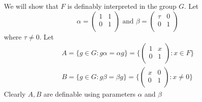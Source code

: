 \documentclass[11pt]{article}
\begin{document}
We will show that \(F\) is definably interpreted in the group \(G\). Let
\begin{equation*}
 \alpha=\begin{pmatrix}
        1&1\\
        0&1\\
        \end{pmatrix}\text{ and }
\beta=\begin{pmatrix}
\tau&0\\
0&1\\
      \end{pmatrix}
\end{equation*}
where \(\tau\neq 0\). Let
\begin{gather*}
A=\{g\in G:g\alpha=\alpha g\}=\{\begin{pmatrix}
1&x\\
0&1\\
                                \end{pmatrix}:x\in F\}\\
B=\{g\in G:g\beta=\beta g\}=\{\begin{pmatrix}
x&0\\
0&1\\
                                \end{pmatrix}:x\neq 0\}
\end{gather*}
Clearly \(A,B\) are definable using parameters \(\alpha\) and \(\beta\)
\end{document}
